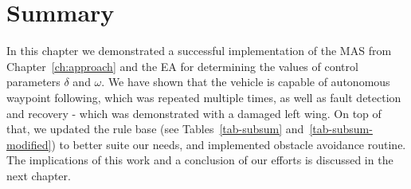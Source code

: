\newpage

\section{Summary}
In this chapter we demonstrated a successful implementation of the MAS from Chapter~\ref{ch:approach} and the EA for determining the values of control parameters $\delta$ and $\omega$. We have shown that the vehicle is capable of autonomous waypoint following, which was repeated multiple times, as well as fault detection and recovery - which was demonstrated with a damaged left wing. On top of that, we updated the rule base (see Tables~\ref{tab-subsum} and~\ref{tab-subsum-modified}) to better suite our needs, and implemented obstacle avoidance routine. The implications of this work and a conclusion of our efforts is discussed in the next chapter.